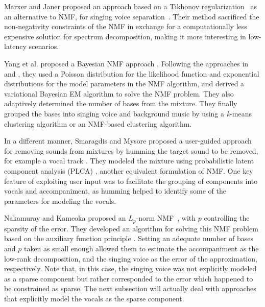 Marxer and Janer proposed an approach based on a Tikhonov regularization~\cite{tikhonov63} as an alternative to NMF, for singing voice separation~\cite{marxer122}. Their method sacrificed the non-negativity constraints of the NMF in exchange for a computationally less expensive solution for spectrum decomposition, making it more interesting in low-latency scenarios.

Yang et al. proposed a Bayesian NMF approach \cite{yang14,chien15}. Following the approaches in \cite{cemgil09} and \cite{schmidt09}, they used a Poisson distribution for the likelihood function and exponential distributions for the model parameters in the NMF algorithm, and derived a variational Bayesian EM  algorithm \cite{dempster77} to solve the NMF problem. They also adaptively determined the number of bases from the mixture. They finally grouped the bases into singing voice and background music by using a \textit{k}-means clustering algorithm \cite{spiertz09} or an NMF-based clustering algorithm.

In a different manner, Smaragdis and Mysore proposed a user-guided approach for removing sounds from mixtures by humming the target sound to be removed, for example a vocal track \cite{smaragdis09}. They modeled the mixture using probabilistic latent component analysis (PLCA) \cite{smaragdis07}, another equivalent formulation of NMF. One key feature of exploiting user input was to facilitate the grouping of components into vocals and accompaniment, as humming helped to identify some of the parameters for modeling the vocals.

Nakamuray and Kameoka proposed an $L_p$-norm NMF~\cite{nakamuray15}, with $p$ controlling the sparsity of the error. They developed an algorithm for solving this NMF problem based on the auxiliary function principle \cite{ortega70,kameoka06}. Setting an adequate number of bases and $p$ taken as small enough allowed them to estimate the accompaniment as the low-rank decomposition, and the singing voice as the error of the approximation, respectively. Note that, in this case, the singing voice was not explicitly modeled as a sparse component but rather corresponded to the error which happened to be constrained as sparse. The next subsection will actually deal with approaches that explicitly model the vocals as the sparse component.


